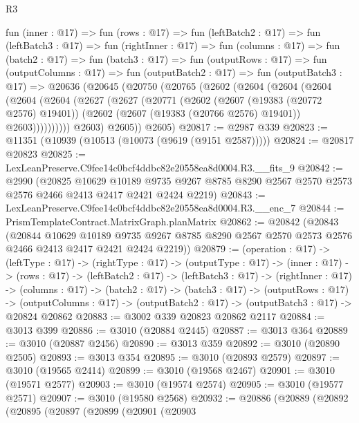 \begin{lexlean}{R3}
\begin{coremodule}
  fun (inner : @17) =>
  fun (rows : @17) =>
  fun (leftBatch2 : @17) =>
  fun (leftBatch3 : @17) =>
  fun (rightInner : @17) =>
  fun (columns : @17) =>
  fun (batch2 : @17) =>
  fun (batch3 : @17) =>
  fun (outputRows : @17) =>
  fun (outputColumns : @17) =>
  fun (outputBatch2 : @17) =>
  fun (outputBatch3 : @17) =>
  @20636
    (@20645
      (@20750
        (@20765
          (@2602
            (@2604
              (@2604
                (@2604
                  (@2604
                    (@2604
                      (@2627
                        (@2627
                          (@20771
                            (@2602
                              (@2607 (@19383 (@20772 @2576) @19401))
                              (@2602 (@2607 (@19383 (@20766 @2576) @19401)) @2603))))))))))
            @2603)
          @2605))
      @2605)
@20817 := @2987 @339
@20823 := @11351 (@10939 (@10513 (@10073 (@9619 (@9151 @2587)))))
@20824 := @20817 @20823
@20825 := LexLeanPreserve.C9fee14c0bcf4ddbc82e20558ea8d0004.R3.__fits_9
@20842 := @2990
    (@20825
      @10629
      @10189
      @9735
      @9267
      @8785
      @8290
      @2567
      @2570
      @2573
      @2576
      @2466
      @2413
      @2417
      @2421
      @2424
      @2219)
@20843 := LexLeanPreserve.C9fee14c0bcf4ddbc82e20558ea8d0004.R3.__enc_7
@20844 := PrismTemplateContract.MatrixGraph.planMatrix
@20862 := @20842
    (@20843
      (@20844
        @10629
        @10189
        @9735
        @9267
        @8785
        @8290
        @2567
        @2570
        @2573
        @2576
        @2466
        @2413
        @2417
        @2421
        @2424
        @2219))
@20879 := (operation : @17) ->
  (leftType : @17) ->
  (rightType : @17) ->
  (outputType : @17) ->
  (inner : @17) ->
  (rows : @17) ->
  (leftBatch2 : @17) ->
  (leftBatch3 : @17) ->
  (rightInner : @17) ->
  (columns : @17) ->
  (batch2 : @17) ->
  (batch3 : @17) ->
  (outputRows : @17) ->
  (outputColumns : @17) -> (outputBatch2 : @17) -> (outputBatch3 : @17) -> @20824 @20862
@20883 := @3002 @339 @20823 @20862 @2117
@20884 := @3013 @399
@20886 := @3010 (@20884 @2445)
@20887 := @3013 @364
@20889 := @3010 (@20887 @2456)
@20890 := @3013 @359
@20892 := @3010 (@20890 @2505)
@20893 := @3013 @354
@20895 := @3010 (@20893 @2579)
@20897 := @3010 (@19565 @2414)
@20899 := @3010 (@19568 @2467)
@20901 := @3010 (@19571 @2577)
@20903 := @3010 (@19574 @2574)
@20905 := @3010 (@19577 @2571)
@20907 := @3010 (@19580 @2568)
@20932 := @20886
    (@20889
      (@20892
        (@20895
          (@20897
            (@20899
              (@20901
                (@20903

\end{coremodule}
\end{lexlean}
